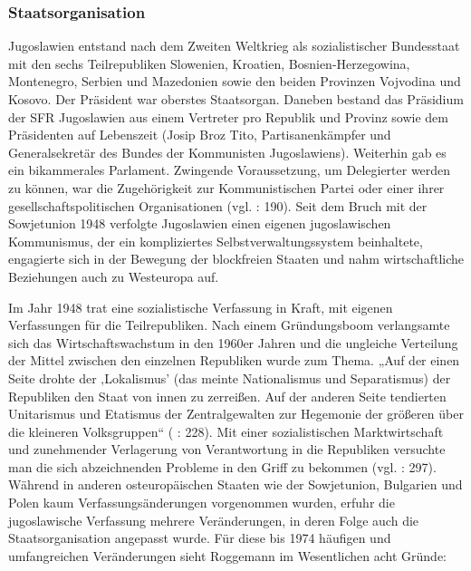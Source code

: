 \subsubsection{Staatsorganisation }

Jugoslawien entstand nach dem Zweiten Weltkrieg als sozialistischer Bundesstaat mit den sechs Teilrepubliken Slowenien, Kroatien, Bosnien-Herzegowina, Montenegro, Serbien und Mazedonien sowie den beiden Provinzen Vojvodina und Kosovo. Der Präsident war oberstes Staatsorgan. Daneben bestand das Präsidium der SFR Jugoslawien aus einem Vertreter pro Republik und Provinz sowie dem Präsidenten auf Lebenszeit (Josip Broz Tito, Partisanenkämpfer und Generalsekretär des Bundes der Kommunisten Jugoslawiens). Weiterhin gab es ein bikammerales Parlament. Zwingende Voraussetzung, um Delegierter werden zu können, war die Zugehörigkeit zur Kommunistischen Partei oder einer ihrer gesellschaftspolitischen Organisationen (vgl. \cite{toepfer} : 190). Seit dem Bruch mit der Sowjetunion 1948 verfolgte Jugoslawien einen eigenen jugoslawischen Kommunismus, der ein kompliziertes Selbstverwaltungssystem beinhaltete, engagierte sich in der Bewegung der blockfreien Staaten und nahm wirtschaftliche Beziehungen auch zu Westeuropa auf.\par
Im Jahr 1948 trat eine sozialistische Verfassung in Kraft, mit eigenen Verfassungen für die Teilrepubliken. Nach einem Gründungsboom verlangsamte sich das Wirtschaftswachstum in den 1960er Jahren und die ungleiche Verteilung der Mittel zwischen den einzelnen Republiken wurde zum Thema. „Auf der einen Seite drohte der ‚Lokalismus’ (das meinte Nationalismus und Separatismus) der Republiken den Staat von innen zu zerreißen. Auf der anderen Seite tendierten Unitarismus und Etatismus der Zentralgewalten zur Hegemonie der größeren über die kleineren Volksgruppen“ (\cite{calic10} : 228). Mit einer sozialistischen Marktwirtschaft und zunehmender Verlagerung von Verantwortung in die Republiken versuchte man die sich abzeichnenden Probleme in den Griff zu bekommen (vgl. \cite{ramet} : 297). Während in anderen osteuropäischen Staaten wie der Sowjetunion, Bulgarien und Polen kaum Verfassungsänderungen vorgenommen wurden, erfuhr die jugoslawische Verfassung mehrere Veränderungen, in deren Folge auch die Staatsorganisation angepasst wurde. Für diese bis 1974 häufigen und umfangreichen Veränderungen sieht Roggemann im Wesentlichen acht Gründe:
